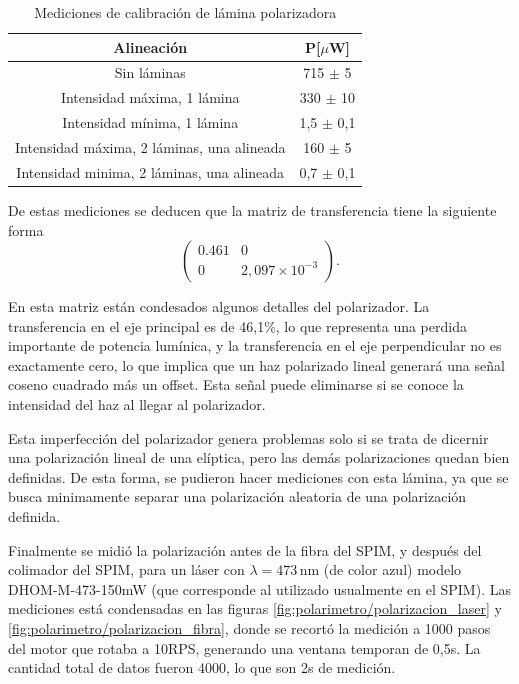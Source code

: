 \begin{table}[H]
    \centering
    \begin{tabular}{c|c}
        Alineación  & P[$\mu$W] \\ \hline
        Sin láminas & 715 $\pm$ 5  \\
        Intensidad máxima, 1 lámina  & 330 $\pm$ 10 \\
        Intensidad mínima, 1 lámina  & 1,5 $\pm$ 0,1 \\
        Intensidad máxima, 2 láminas, una alineada & 160 $\pm$ 5 \\
        Intensidad minima, 2 láminas, una alineada & 0,7 $\pm$ 0,1 \\
    \end{tabular}
    \caption{Mediciones de calibración de lámina polarizadora}
    \label{tbl:polarimetro/calibracion}
\end{table}

De estas mediciones se deducen que la matriz de transferencia tiene la siguiente forma
\begin{equation}
    \begin{pmatrix} 0.461 & 0 \\ 0 & 2,097\times10^{-3} \end{pmatrix}.
\end{equation}

En esta matriz están condesados algunos detalles del polarizador. La transferencia en el eje principal es de 46,1\%, lo que representa una perdida importante de potencia lumínica, y la transferencia en el eje perpendicular no es exactamente cero, lo que implica que un haz polarizado lineal generará una señal coseno cuadrado más un offset. Esta señal puede eliminarse si se conoce la intensidad del haz al llegar al polarizador. 

Esta imperfección del polarizador genera problemas solo si se trata de dicernir una polarización lineal de una elíptica, pero las demás polarizaciones quedan bien definidas. De esta forma, se pudieron hacer mediciones con esta lámina, ya que se busca minimamente separar una polarización aleatoria de una polarización definida.

Finalmente se midió la polarización antes de la fibra del SPIM, y después del colimador del SPIM, para un láser con $\lambda = 473\,$nm (de color azul) modelo DHOM-M-473-150mW (que corresponde al utilizado usualmente en el SPIM). Las mediciones está condensadas en las figuras \ref{fig:polarimetro/polarizacion_laser} y \ref{fig:polarimetro/polarizacion_fibra}, donde se recortó la medición a 1000 pasos del motor que rotaba a 10RPS, generando una ventana temporan de 0,5s. La cantidad total de datos fueron 4000, lo que son 2s de medición.

